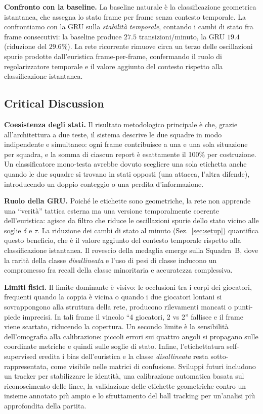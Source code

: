 \documentclass[10pt,twocolumn,a4paper]{article}
\begin{document}
	\textbf{Confronto con la baseline.} La baseline naturale è la classificazione
	geometrica istantanea, che assegna lo stato frame per frame senza contesto
	temporale. La confrontiamo con la GRU sulla \emph{stabilità temporale},
	contando i cambi di stato fra frame consecutivi: la baseline produce $27.5$
	transizioni/minuto, la GRU $19.4$ (riduzione del $29.6\%$). La rete ricorrente
	rimuove circa un terzo delle oscillazioni spurie prodotte dall'euristica
	frame-per-frame, confermando il ruolo di regolarizzatore temporale e il valore
	aggiunto del contesto rispetto alla classificazione istantanea.

	\subsection{Critical Discussion}
	\label{sec:discussion}

	\textbf{Coesistenza degli stati.} Il risultato metodologico principale è che,
	grazie all'architettura a due teste, il sistema descrive le due squadre in
	modo indipendente e simultaneo: ogni frame contribuisce a una e una sola
	situazione per squadra, e la somma di ciascun report è esattamente il 100\%
	per costruzione. Un classificatore mono-testa avrebbe dovuto scegliere una
	sola etichetta anche quando le due squadre si trovano in stati opposti (una
	attacca, l'altra difende), introducendo un doppio conteggio o una perdita
	d'informazione.

	\textbf{Ruolo della GRU.} Poiché le etichette sono geometriche, la rete non
	apprende una ``verità'' tattica esterna ma una versione temporalmente
	coerente dell'euristica: agisce da filtro che riduce le oscillazioni spurie
	dello stato vicino alle soglie $\delta$ e $\tau$. La riduzione dei cambi di
	stato al minuto (Sez.~\ref{sec:setup}) quantifica questo beneficio, che è il
	valore aggiunto del contesto temporale rispetto alla classificazione
	istantanea. Il rovescio della medaglia emerge sulla Squadra~B, dove la rarità
	della classe \emph{disallineata} e l'uso di pesi di classe inducono un
	compromesso fra recall della classe minoritaria e accuratezza complessiva.

	\textbf{Limiti fisici.} Il limite dominante è visivo: le occlusioni tra i
	corpi dei giocatori, frequenti quando la coppia è vicina o quando i due
	giocatori lontani si sovrappongono alla struttura della rete, producono
	rilevamenti mancati o punti-piede imprecisi. In tali frame il vincolo
	``4 giocatori, 2 vs 2'' fallisce e il frame viene scartato, riducendo la
	copertura. Un secondo limite è la sensibilità dell'omografia alla
	calibrazione: piccoli errori sui quattro angoli si propagano sulle coordinate
	metriche e quindi sulle soglie di stato. Infine, l'etichettatura
	self-supervised eredita i bias dell'euristica e la classe \emph{disallineata}
	resta sotto-rappresentata, come visibile nelle matrici di confusione.
	Sviluppi futuri includono un tracker per stabilizzare le identità, una
	calibrazione automatica basata sul riconoscimento delle linee, la
	validazione delle etichette geometriche contro un insieme annotato più ampio
	e lo sfruttamento del ball tracking per un'analisi più approfondita della partita.
\end{document}
